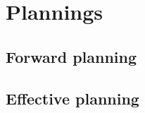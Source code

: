 

\chapter{Plannings} \label{annexe_planning}

\section{Forward planning}

\section{Effective planning}
% 